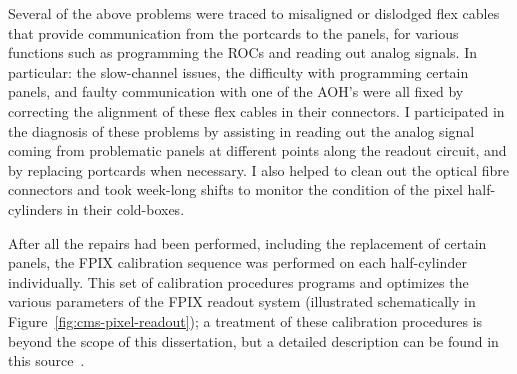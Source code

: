 Several of the above problems were traced to misaligned or dislodged flex cables that provide communication from the portcards to the panels, for various functions such as programming the ROCs and reading out analog signals. In particular: the slow-channel issues, the difficulty with programming certain panels, and faulty communication with one of the AOH's were all fixed by correcting the alignment of these flex cables in their connectors. I participated in the diagnosis of these problems by assisting in reading out the analog signal coming from problematic panels at different points along the readout circuit, and by replacing portcards when necessary. I also helped to clean out the optical fibre connectors and took week-long shifts to monitor the condition of the pixel half-cylinders in their cold-boxes.

After all the repairs had been performed, including the replacement of certain panels, the FPIX calibration sequence was performed on each half-cylinder individually. This set of calibration procedures programs and optimizes the various parameters of the FPIX readout system (illustrated schematically in Figure~\ref{fig:cms-pixel-readout}); a treatment of these calibration procedures is beyond the scope of this dissertation, but a detailed description can be found in this source~\cite{CMS-pixel-calibrations}.

